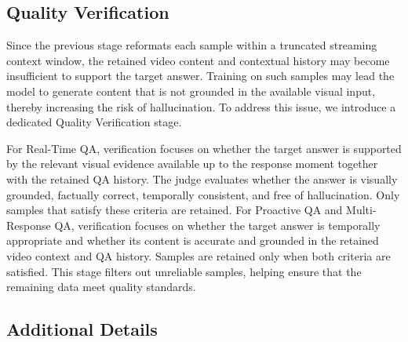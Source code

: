 \subsection{Quality Verification}
\label{sec:quality_verify}





Since the previous stage reformats each sample within a truncated streaming context window, the retained video content and contextual history may become insufficient to support the target answer. Training on such samples may lead the model to generate content that is not grounded in the available visual input, thereby increasing the risk of hallucination. To address this issue, we introduce a dedicated Quality Verification stage.

For Real-Time QA, verification focuses on whether the target answer is supported by the relevant visual evidence available up to the response moment together with the retained QA history. The judge evaluates whether the answer is visually grounded, factually correct, temporally consistent, and free of hallucination. Only samples that satisfy these criteria are retained. For Proactive QA and Multi-Response QA, verification focuses on whether the target answer is temporally appropriate and whether its content is accurate and grounded in the retained video context and QA history. Samples are retained only when both criteria are satisfied. This stage filters out unreliable samples, helping ensure that the remaining data meet quality standards.












\subsection{Additional Details}



